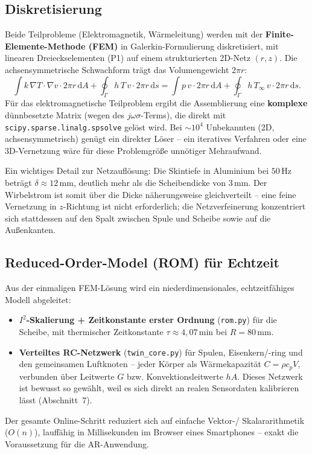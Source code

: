 \documentclass[a4paper,11pt]{article}
\begin{document}
\subsection{Diskretisierung}
Beide Teilprobleme (Elektromagnetik, Wärmeleitung) werden mit der
\textbf{Finite-Elemente-Methode (FEM)} in Galerkin-Formulierung diskretisiert,
mit linearen Dreieckselementen (P1) auf einem strukturierten 2D-Netz
$(r,z)$. Die achsensymmetrische Schwachform trägt das Volumengewicht
$2\pi r$:
\[
  \int k\,\nabla T\!\cdot\!\nabla v \cdot 2\pi r \,\mathrm dA
  + \oint_\Gamma h\,T\,v\cdot 2\pi r\,\mathrm ds
  = \int p\,v\cdot 2\pi r\,\mathrm dA
  + \oint_\Gamma h\,T_\infty\,v\cdot 2\pi r\,\mathrm ds .
\]
Für das elektromagnetische Teilproblem ergibt die Assemblierung eine
\textbf{komplexe} dünnbesetzte Matrix (wegen des $j\omega\sigma$-Terms), die
direkt mit \texttt{scipy.sparse.linalg.spsolve} gelöst wird. Bei
$\sim\!10^{4}$ Unbekannten (2D, achsensymmetrisch) genügt ein direkter
Löser -- ein iteratives Verfahren oder eine 3D-Vernetzung wäre für diese
Problemgröße unnötiger Mehraufwand.

Ein wichtiges Detail zur Netzauflösung: Die Skintiefe in Aluminium bei
$50\,\mathrm{Hz}$ beträgt $\delta \approx 12\,\mathrm{mm}$, deutlich mehr als
die Scheibendicke von $3\,\mathrm{mm}$. Der Wirbelstrom ist somit über die
Dicke näherungsweise gleichverteilt -- eine feine Vernetzung in
$z$-Richtung ist nicht erforderlich; die Netzverfeinerung konzentriert sich
stattdessen auf den Spalt zwischen Spule und Scheibe sowie auf die
Außenkanten.

\subsection{Reduced-Order-Model (ROM) für Echtzeit}
Aus der einmaligen FEM-Lösung wird ein niederdimensionales, echtzeitfähiges
Modell abgeleitet:
\begin{itemize}[nosep]
  \item \textbf{$I^2$-Skalierung + Zeitkonstante erster Ordnung}
        (\texttt{rom.py}) für die Scheibe, mit thermischer Zeitkonstante
        $\tau \approx 4{,}07\,\mathrm{min}$ bei $R=80\,\mathrm{mm}$.
  \item \textbf{Verteiltes RC-Netzwerk} (\texttt{twin\_core.py}) für Spulen,
        Eisenkern/-ring und den gemeinsamen Luftknoten -- jeder Körper als
        Wärmekapazität $C=\rho c_p V$, verbunden über Leitwerte $G$ bzw.
        Konvektionsleitwerte $hA$. Dieses Netzwerk ist bewusst so gewählt,
        weil es sich direkt an realen Sensordaten kalibrieren lässt
        (Abschnitt~7).
\end{itemize}
Der gesamte Online-Schritt reduziert sich auf einfache Vektor-/
Skalararithmetik ($O(n)$), lauffähig in Millisekunden im Browser eines
Smartphones -- exakt die Voraussetzung für die AR-Anwendung.
\end{document}
